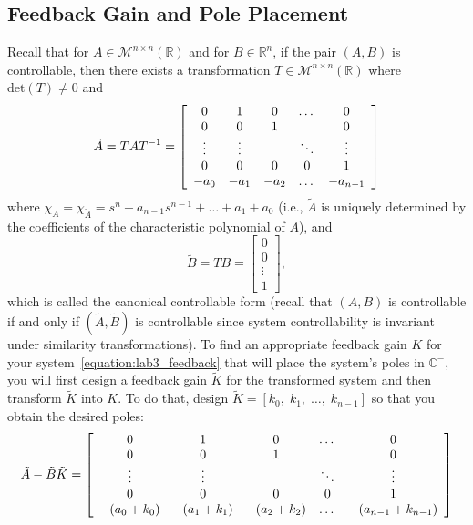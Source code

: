 \subsection{Feedback Gain and Pole Placement}\label{subsection:feedback}
Recall that for $A \in \mathcal{M}^{n \times n}(\mathbb{R})$ and for $B \in \mathbb{R}^n$, if the pair $(A,B)$ is controllable, then there exists a transformation $T \in \mathcal{M}^{n \times n}(\mathbb{R})$ where $\text{det}(T) \not = 0$ and
\begin{equation}\label{eq:A_tilde}
    \tilde{A} = TAT^{-1} =
    \left[\begin{array}{c c c c c}
            0      & 1      & 0    & \dots  & 0        \\
            0      & 0      & 1    &        & 0        \\
            \vdots & \vdots &      & \ddots & \vdots   \\
            0      & 0      & 0    & 0      & 1        \\
            -a_0   & -a_1   & -a_2 & \dots  & -a_{n-1}
        \end{array}\right]
\end{equation}
where $\chi_{A} = \chi_{\tilde{A}} = s^n + a_{n-1} s^{n-1} + \dots + a_1 + a_0$ (i.e., $\tilde{A}$ is uniquely determined by the coefficients of the characteristic polynomial of $A$), and
\[
    \tilde{B} = TB =
    \left[\begin{array}{c}
            0      \\
            0      \\
            \vdots \\
            1
        \end{array}\right],
\]
which is called the canonical controllable form (recall that $(A,B)$ is controllable if and only if $(\tilde{A},\tilde{B})$ is controllable since system controllability is invariant under similarity transformations). To find an appropriate feedback gain $K$ for your system~\eqref{equation:lab3_feedback} that will place the system's poles in $\mathbb{C}^-$, you will first design a feedback gain $\tilde{K}$ for the transformed system and then transform $\tilde{K}$ into $K$. To do that, design $\tilde{K} = [k_0, \; k_1, \; \dots, \; k_{n-1}]$ so that you obtain the desired poles:
\[
    \tilde{A}-\tilde{B}\tilde{K} =
    \left[\begin{array}{c c c c  c}
            0          & 1          & 0          & \dots  & 0                  \\
            0          & 0          & 1          &        & 0                  \\
            \vdots     & \vdots     &            & \ddots & \vdots             \\
            0          & 0          & 0          & 0      & 1                  \\
            -(a_0+k_0) & -(a_1+k_1) & -(a_2+k_2) & \dots  & -(a_{n-1}+k_{n-1})
        \end{array}\right]
\]

